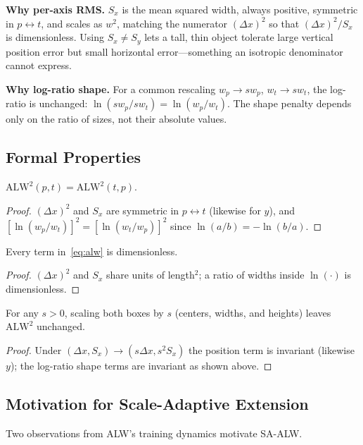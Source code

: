 \documentclass[runningheads]{llncs}
\newcommand{\alwsq}{\text{ALW}^2}
\newcommand{\Sx}{S_x}
\newcommand{\Sy}{S_y}
\begin{document}
\textbf{Why per-axis RMS.} $\Sx$ is the mean squared width, always positive,
symmetric in $p\leftrightarrow t$, and scales as $w^2$, matching the
numerator $(\Delta x)^2$ so that $(\Delta x)^2/\Sx$ is dimensionless. Using
$\Sx\neq\Sy$ lets a tall, thin object tolerate large vertical position error
but small horizontal error—something an isotropic denominator cannot express.

\textbf{Why log-ratio shape.} For a common rescaling $w_p\!\to\!sw_p$,
$w_t\!\to\!sw_t$, the log-ratio is unchanged: $\ln(sw_p/sw_t)=\ln(w_p/w_t)$.
The shape penalty depends only on the ratio of sizes, not their absolute
values.

\subsection{Formal Properties}
\label{sec:props}

\begin{theorem}[Symmetry]
$\alwsq(p,t)=\alwsq(t,p)$.
\end{theorem}
\begin{proof}
$(\Delta x)^2$ and $\Sx$ are symmetric in $p\leftrightarrow t$ (likewise for
$y$), and $[\ln(w_p/w_t)]^2=[\ln(w_t/w_p)]^2$ since $\ln(a/b)=-\ln(b/a)$.
\end{proof}

\begin{theorem}
Every term in~\eqref{eq:alw} is dimensionless.
\end{theorem}
\begin{proof}
$(\Delta x)^2$ and $\Sx$ share units of length$^2$; a ratio of widths inside
$\ln(\cdot)$ is dimensionless.
\end{proof}

\begin{theorem}
For any $s>0$, scaling both boxes by $s$ (centers, widths, and heights)
leaves $\alwsq$ unchanged.
\end{theorem}
\begin{proof}
Under $(\Delta x,\Sx)\!\to\!(s\Delta x, s^2\Sx)$ the position term is
invariant (likewise $y$); the log-ratio shape terms are invariant as shown
above.
\end{proof}

\subsection{Motivation for Scale-Adaptive Extension}
Two observations from ALW's training dynamics motivate SA-ALW.
\end{document}
